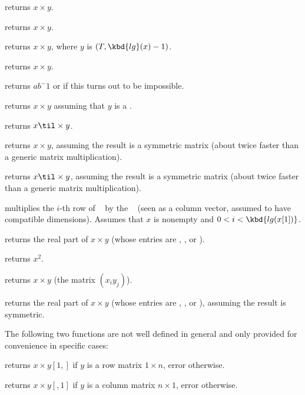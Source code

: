  returns $x\times y$.

 returns $x\times y$.

 returns $x \times y$, where $y$
is $(T, \kbd{lg}(x)-1)$.

 returns $x\times y$.

 returns $ab^-1$ or  if this turns
out to be impossible.

 returns $x\times y$ assuming that $y$ is
a .

 returns $x\til \times y$.

 returns $x\times y$, assuming
the result is a symmetric matrix (about twice faster than a generic matrix
multiplication).

 returns $x\til \times y$, assuming
the result is a symmetric matrix (about twice faster than a generic matrix
multiplication).

 multiplies the $i$-th row of
~ by the ~ (seen as a column vector, assumed
to have compatible dimensions). Assumes that $x$ is nonempty and $0 < i <
\kbd{lg(x[1])}$.

 returns the real part of $x\times y$
(whose entries are , ,  or ).

 returns $x^2$.

 returns $x\times y$ (the matrix
$(x_iy_j)$).

 returns the real part of $x\times
y$ (whose entries are , ,  or ),
assuming the result is symmetric.

The following two functions are not well defined in general and only provided
for convenience in specific cases:

 returns $x\times y[1,]$ if $y$ is
a row matrix $1\times n$, error otherwise.

 returns $x\times y[,1]$ if $y$ is
a column matrix $n\times 1$, error otherwise.

